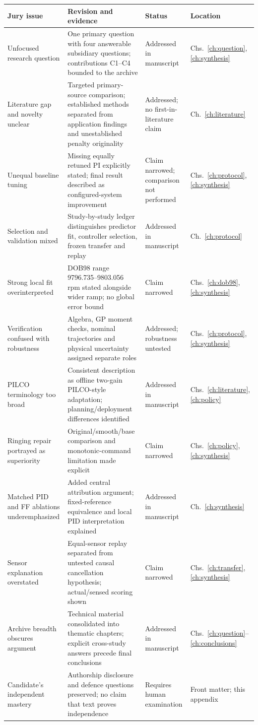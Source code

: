 \small
\begin{longtable}{@{}p{.18\linewidth}p{.37\linewidth}p{.17\linewidth}p{.19\linewidth}@{}}
\toprule Jury issue & Revision and evidence & Status & Location\\\midrule\endhead
Unfocused research question & One primary question with four answerable subsidiary questions; contributions C1--C4 bounded to the archive & Addressed in manuscript & Chs.~\ref{ch:question}, \ref{ch:synthesis}\\
Literature gap and novelty unclear & Targeted primary-source comparison; established methods separated from application findings and unestablished penalty originality & Addressed; no first-in-literature claim & Ch.~\ref{ch:literature}\\
Unequal baseline tuning & Missing equally retuned PI explicitly stated; final result described as configured-system improvement & Claim narrowed; comparison not performed & Chs.~\ref{ch:protocol}, \ref{ch:synthesis}\\
Selection and validation mixed & Study-by-study ledger distinguishes predictor fit, controller selection, frozen transfer and replay & Addressed in manuscript & Ch.~\ref{ch:protocol}\\
Strong local fit overinterpreted & DOB98 range 9796.735--9803.056 rpm stated alongside wider ramp; no global error bound & Claim narrowed & Chs.~\ref{ch:dob98}, \ref{ch:synthesis}\\
Verification confused with robustness & Algebra, GP moment checks, nominal trajectories and physical uncertainty assigned separate roles & Addressed; robustness untested & Chs.~\ref{ch:protocol}, \ref{ch:synthesis}\\
PILCO terminology too broad & Consistent description as offline two-gain PILCO-style adaptation; planning/deployment differences identified & Addressed in manuscript & Chs.~\ref{ch:literature}, \ref{ch:policy}\\
Ringing repair portrayed as superiority & Original/smooth/base comparison and monotonic-command limitation made explicit & Claim narrowed & Chs.~\ref{ch:policy}, \ref{ch:synthesis}\\
Matched PID and FF ablations underemphasized & Added central attribution argument; fixed-reference equivalence and local PID interpretation explained & Addressed in manuscript & Ch.~\ref{ch:synthesis}\\
Sensor explanation overstated & Equal-sensor replay separated from untested causal cancellation hypothesis; actual/sensed scoring shown & Claim narrowed & Chs.~\ref{ch:transfer}, \ref{ch:synthesis}\\
Archive breadth obscures argument & Technical material consolidated into thematic chapters; explicit cross-study answers precede final conclusions & Addressed in manuscript & Chs.~\ref{ch:question}--\ref{ch:conclusions}\\
Candidate's independent mastery & Authorship disclosure and defence questions preserved; no claim that text proves independence & Requires human examination & Front matter; this appendix\\\bottomrule
\end{longtable}
\normalsize

